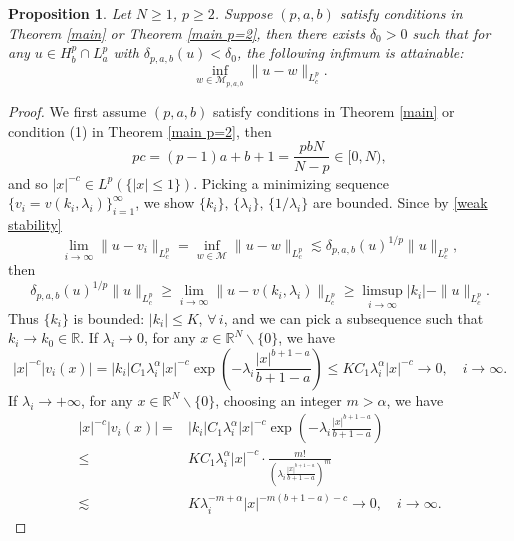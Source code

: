 \documentclass[11pt]{article}
\newtheorem{proposition}[theorem]{Proposition}
\newcommand{\R}{\mathbb{R}}
\numberwithin{equation}{section}
\begin{document}
\begin{proposition}\label{min}
    Let $N\ge 1$, $p\ge 2$. Suppose $(p,a,b)$ satisfy conditions in Theorem \ref{main} or Theorem \ref{main p=2}, then there exists $\delta_0>0$ such that for any $u\in H_b^p\cap L_a^p$ with $\delta_{p,a,b}(u)<\delta_0$, the following infimum is attainable:
    \begin{equation}\label{inf of u-v}
        \inf_{w\in\mathcal{M}_{p,a,b}}\|u-w\|_{L_c^p}.
    \end{equation}
\end{proposition}
\begin{proof}
    We first assume $(p,a,b)$ satisfy conditions in Theorem
    \ref{main} or condition (1) in Theorem \ref{main p=2}, then
    \[ pc = (p-1)a+b+1 = \frac{pbN}{N-p} \in [0, N), \]
    and so $|x|^{-c}\in L^p(\{|x|\le 1\})$. Picking a minimizing sequence $\{v_i=v(k_i,\lambda_i)\}_{i=1}^\infty$, we show $\{k_i\},\,\{\lambda_i\},\,\{1/\lambda_i\}$ are bounded. Since by \eqref{weak stability}
    \begin{equation*}
        \lim_{i\to \infty}\|u-v_i\|_{L^p_c} = \inf_{w\in\mathcal{M}}\|u-w\|_{L^p_c} \lesssim \delta_{p,a,b}(u)^{1/p}\|u\|_{L^p_c},
    \end{equation*}
    then
    \begin{equation}
        \delta_{p,a,b}(u)^{1/p}\|u\|_{L^p_c} \ge \lim_{i\to \infty} \|u-v(k_i,\lambda_i)\|_{L^p_c} \ge \limsup_{i\to \infty} |k_i| - \|u\|_{L^p_c}.
    \end{equation}
    Thus $\{k_i\}$ is bounded: $|k_i|\le K$, $\forall\, i$, and we can pick a subsequence such that $k_i\to k_0\in \R$. If $\lambda_i\to 0$, for any $x\in \R^N\backslash\{0\}$, we have
    \begin{equation*}
        |x|^{-c}|v_i(x)| = |k_i|C_1\lambda_i^{\alpha}|x|^{-c}\exp\left(-\lambda_i\frac{|x|^{b+1-a}}{b+1-a}\right) \le KC_1\lambda_i^{\alpha}|x|^{-c} \to 0,\quad i\to \infty.
    \end{equation*}
    If $\lambda_i\to +\infty$, for any $x\in\R^N\backslash\{0\}$, choosing an integer $m > \alpha$, we have
    \begin{align*}
        |x|^{-c}|v_i(x)| ={}& |k_i|C_1\lambda_i^{\alpha}|x|^{-c}\exp\left(-\lambda_i\frac{|x|^{b+1-a}}{b+1-a}\right)\\
        \le{}& KC_1\lambda_i^{\alpha}|x|^{-c} \cdot \frac{m!}{\left(\lambda_i \frac{|x|^{b+1-a}}{b+1-a}\right)^m}\\
        \lesssim{}& K\lambda_i^{-m + \alpha}|x|^{-m(b+1-a)-c} \to 0, \quad i\to \infty.

\end{align*}
\end{proof}
\end{document}
